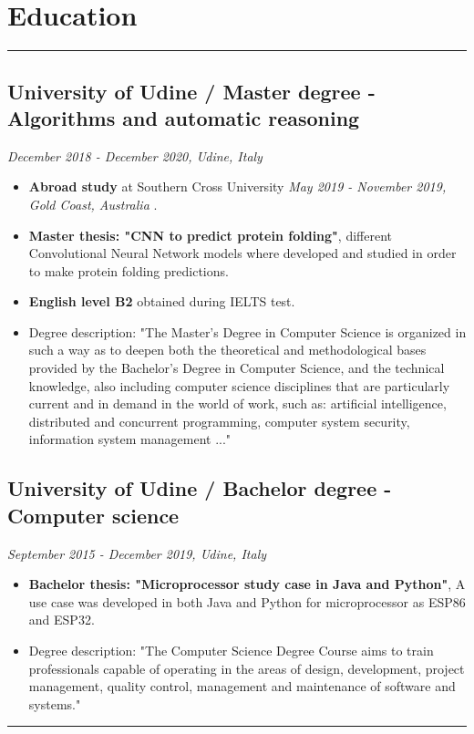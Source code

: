 \documentclass[a4paper,10pt]{article}
\begin{document}
\begin{minipage}[t]{0.25\textwidth}
        \section*{Education}
    \vspace{11.8cm} %
    \rule{0.6cm}{0.3mm}
\end{minipage}
\hfill
\begin{minipage}[t]{0.75\textwidth}
     \subsection*{University of Udine / Master degree - Algorithms and automatic reasoning }
    \textit{December 2018 - December 2020, Udine, Italy} \\
    \begin{itemize}[leftmargin=1cm]
        \item \textbf{Abroad study} at Southern Cross University \textit{May 2019 - November 2019, Gold Coast, Australia} .
        \item \textbf{Master thesis: "CNN to predict protein folding"}, different Convolutional Neural Network models where developed and studied in order to make protein folding predictions.
        \item \textbf{English level B2} obtained during IELTS test. 
         \item Degree description: "The Master's Degree in Computer Science is organized in such a way as to deepen both the theoretical and methodological bases provided by the Bachelor's Degree in Computer Science, and the technical knowledge, also including computer science disciplines that are particularly current and in demand in the world of work, such as: artificial intelligence, distributed and concurrent programming, computer system security, information system management ..."
    \end{itemize}

    \subsection*{University of Udine / Bachelor degree - Computer science }
    \textit{September 2015 - December 2019, Udine, Italy} \\
        \begin{itemize}[leftmargin=1cm]
        \item \textbf{Bachelor thesis:   "Microprocessor study case in Java and Python"}, A use case was developed in both Java and Python for microprocessor as ESP86 and ESP32.
        \item Degree description: "The Computer Science Degree Course aims to train professionals capable of operating in the areas of design, development, project management, quality control, management and maintenance of software and systems."
    \end{itemize}
    \rule{\linewidth}{0.5mm}
\end{minipage}
\end{document}
